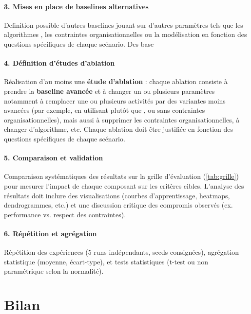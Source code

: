 \paragraph{3. Mises en place de baselines alternatives}
Definition possible d'autres baselines jouant sur d'autres paramètres tels que les algorithmes , les contraintes organisationnelles ou la modélisation en fonction des questions spécifiques de chaque scénario. Des base

\paragraph{4. Définition d'études d'ablation}
Réalisation d'au moins une \textbf{étude d'ablation} : chaque ablation consiste à prendre la \textbf{baseline avancée} et à changer un ou plusieurs paramètres notamment à remplacer une ou plusieurs activités  par des variantes moins avancées (par exemple,  en utilisant  plutôt que , ou  sans contraintes organisationnelles), mais aussi à supprimer les contraintes organisationnelles, à changer d'algorithme, etc. Chaque ablation doit être justifiée en fonction des questions spécifiques de chaque scénario.

\paragraph{5. Comparaison et validation}
Comparaison systématiques des résultats sur la grille d'évaluation (\autoref{tab:grille}) pour mesurer l'impact de chaque composant sur les critères cibles. L'analyse des résultats doit inclure des visualisations (courbes d'apprentissage, heatmaps, dendrogrammes, etc.) et une discussion critique des compromis observés (ex. performance vs. respect des contraintes).

\paragraph{6. Répétition et agrégation}
Répétition des expériences (5 runs indépendants, seeds consignées), agrégation statistique (moyenne, écart-type), et tests statistiques (t-test ou non paramétrique selon la normalité).


\section{Bilan}

